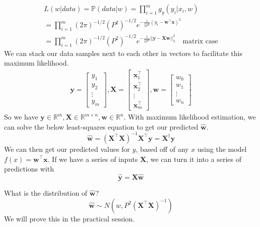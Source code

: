 \documentclass[11pt]{article}
\begin{document}
\begin{gather}
  L(w|data) = \mathbb{P} (data|w) = \prod_{i=1}^{m} g_y(y_i | x_i, w) \\
  = \prod_{i=1}^{m} (2\pi)^{-1/2}(P^2)^{-1/2}e^{-\frac{1}{2P^2}(y_i - \textbf{w}^\top \textbf{x})^2} \\
  = \prod_{i=1}^{m} (2\pi)^{-1/2}(P^2)^{-1/2}e^{-\frac{1}{2P^2} ||\textbf{y} - \textbf{X} \textbf{w}||_2^2 } \quad \text{matrix case}
\end{gather}
We can stack our data samples next to each other in vectors to facilitate this maximum likelihood.
\begin{align}
  \textbf{y} = 
  \begin{bmatrix}
    y_1 \\ y_2 \\ \vdots \\ y_m 
  \end{bmatrix},
  \textbf{X} = 
  \begin{bmatrix}
    \textbf{x}_1^\top \\
    \textbf{x}_2^\top \\
    \vdots \\
    \textbf{x}_m^\top
  \end{bmatrix},
  \textbf{w} = 
  \begin{bmatrix}
    w_0 \\ w_1 \\ \vdots \\ w_n
  \end{bmatrix}
\end{align}
So we have $\textbf{y} \in \mathbb{R}^m, \textbf{X} \in \mathbb{R}^{m \times n}, \textbf{w} \in \mathbb{R}^n$.
With maximum likelihood estimation, we can solve the below least-squares equation to get our predicted $\hat{\textbf{w}}$.
\begin{equation}
  \hat{\textbf{w}} = (\textbf{X}^\top \textbf{X})^{-1} \textbf{X}^\top \textbf{y} = \textbf{X}^\dagger \textbf{y}
\end{equation}
We can then get our predicted values for $y$, based off of any $x$ using the model $f(x) = \textbf{w}^\top \textbf{x}$.
If we have a series of inputs $\textbf{X}$, we can turn it into a series of predictions with
\begin{equation}
  \hat{\textbf{y}} = \textbf{X} \hat{\textbf{w}}
\end{equation}

What is the distribution of $\hat{\textbf{w}}$?
\begin{equation}
  \hat{\mathbf{w}} \sim N(w, P^2(\mathbf{X}^\top \textbf{X})^{-1})
\end{equation}
We will prove this in the practical session.
\end{document}
